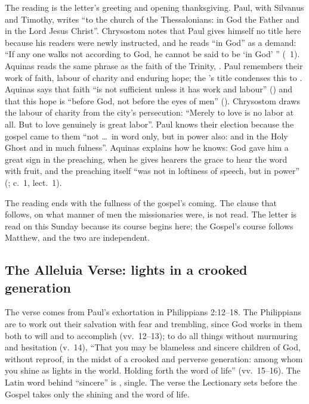The reading is the letter's greeting and opening thanksgiving. Paul, with
Silvanus and Timothy, writes ``to the church of the Thessalonians: in God the
Father and in the Lord Jesus Christ''. Chrysostom notes that Paul gives himself
no title here because his readers were newly instructed, and he reads ``in
God'' as a demand: ``If any one walks not according to God, he cannot be said
to be `in God' '' (~1). Aquinas reads the
same phrase as the faith of the Trinity, . Paul
remembers their work of faith, labour of charity and enduring hope; the
's title condenses this to . Aquinas says that faith ``is not sufficient unless it has work and
labour'' () and
that this hope is ``before God, not before the eyes of men'' (). Chrysostom draws
the labour of charity from the city's persecution: ``Merely to love is no labor
at all. But to love genuinely is great labor''. Paul knows their election
because the gospel came to them ``not \ldots\ in word only, but in power
also: and in the Holy Ghost and in much fulness''. Aquinas explains how he
knows: God gave him a great sign in the preaching, when he gives hearers the
grace to hear the word with fruit, and the preaching itself ``was not in
loftiness of speech, but in power'' (;  c.~1, lect.~1).

The reading ends with the fullness of the gospel's coming. The clause that
follows, on what manner of men the missionaries were, is not read. The letter
is read on this Sunday because its course begins here; the Gospel's course
follows Matthew, and the two are independent.

\subsection{The Alleluia Verse: lights in a crooked generation}

The verse comes from Paul's exhortation in Philippians 2:12--18. The
Philippians are to work out their salvation with fear and trembling, since God
works in them both to will and to accomplish (vv.~12--13); to do all things
without murmuring and hesitation (v.~14), ``That you may be blameless and
sincere children of God, without reproof, in the midst of a crooked and
perverse generation: among whom you shine as lights in the world. Holding forth
the word of life'' (vv.~15--16). The Latin word behind ``sincere'' is
, single. The verse the Lectionary sets before the Gospel
takes only the shining and the word of life.

